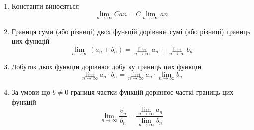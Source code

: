 \begin{center}\large{}\end{center}

\begin{enumerate}
  \item Константи виносяться
  \begin{displaymath}
    \lim_{n \to \infty} Can = C \lim_{n \to \infty}an
  \end{displaymath}

  \item Границя суми (або різниці) двох функцій дорівнює сумі (або різниці) границь цих функцій
  \begin{displaymath}
    \lim_{n \to \infty} (a_n \pm b_n) =  \lim_{n \to \infty} a_n  \pm \lim_{n \to \infty} b_n
  \end{displaymath}

  \item Добуток двох функцій дорівнює добутку границь цих функцій
  \begin{displaymath}
    \lim_{n \to \infty} a_n \cdot b_n =  \lim_{n \to \infty} a_n \cdot \lim_{n \to \infty} b_n
  \end{displaymath}

  \item За умови що $b\ne0$ границя частки функцій дорівнює часткі границь цих функцій
  \begin{displaymath}
    \lim_{n \to \infty} \frac{a_n}{b_n} =
      \frac{\lim_{n \to \infty}{a_n}}{\lim_{n \to \infty}{b_n}}
  \end{displaymath}

\end{enumerate}
